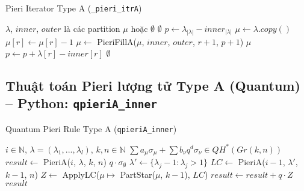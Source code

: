 \begin{algorithm}[H]
\caption{Pieri Iterator Type A (\texttt{\_pieri\_itrA})}
\begin{algorithmic}[1]
\REQUIRE $\lambda$, $inner$, $outer$ là các partition
\ENSURE $\mu$ hoặc $\emptyset$
\IF{$\lambda = \emptyset$}
    \RETURN $\emptyset$
\ENDIF
\STATE $p \gets \lambda_{|\lambda|} - inner_{|\lambda|}$
        \STATE $\mu \gets \lambda.copy()$
        \STATE $\mu[r] \gets \mu[r] - 1$
        \STATE $\mu \gets$ PieriFillA($\mu$, $inner$, $outer$, $r+1$, $p+1$)
        \IF{$\mu \neq \emptyset$}
            \RETURN $\mu$
        \ENDIF
    \ENDIF
    \STATE $p \gets p + \lambda[r] - inner[r]$
\ENDFOR
\RETURN $\emptyset$
\end{algorithmic}
\end{algorithm}

\subsection*{Thuật toán Pieri lượng tử Type A (Quantum) -- Python: \texttt{qpieriA\_inner}}

\begin{algorithm}[H]
\caption{Quantum Pieri Rule Type A (\texttt{qpieriA\_inner})}
\begin{algorithmic}[1]
\REQUIRE $i \in \mathbb{N}$, $\lambda = (\lambda_1, ..., \lambda_l)$, $k, n \in \mathbb{N}$
\ENSURE $\sum a_\mu \sigma_\mu + \sum b_\nu q^d \sigma_\nu \in QH^*(Gr(k,n))$
\STATE $result \gets$ PieriA($i$, $\lambda$, $k$, $n$) 
        \RETURN $q \cdot \sigma_{\emptyset}$
    \ENDIF
    \STATE $\lambda' \gets \{\lambda_j - 1 : \lambda_j > 1\}$
    \STATE $LC \gets$ PieriA($i-1$, $\lambda'$, $k-1$, $n$)
    \STATE $Z \gets$ ApplyLC($\mu \mapsto$ PartStar($\mu$, $k-1$), $LC$)
    \STATE $result \gets result + q \cdot Z$
\ENDIF
\RETURN $result$
\end{algorithmic}
\end{algorithm}

